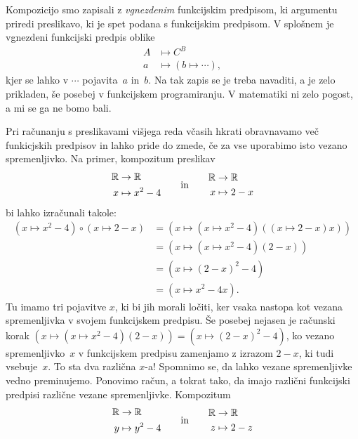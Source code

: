 Kompozicijo smo zapisali z \emph{vgnezdenim} funkcijskim predpisom, ki argumentu priredi
preslikavo, ki je spet podana s funkcijskim predpisom. V splošnem je vgnezdeni funkcijski
predpis oblike
%
\begin{align*}
  A &\mapsto C^B \\
  a &\mapsto (b \mapsto \cdots),
\end{align*}
%
kjer se lahko v $\cdots$ pojavita~$a$ in~$b$. Na tak zapis se je treba navaditi, a je zelo
prikladen, še posebej v funkcijskem programiranju. V matematiki ni zelo pogost, a mi se ga
ne bomo bali.

Pri računanju s preslikavami višjega reda včasih hkrati obravnavamo več funkicjskih
predpisov in lahko pride do zmede, če za vse uporabimo isto vezano spremenljivko. Na
primer, kompozitum preslikav
%
\begin{equation*}
  \begin{aligned}
    \mathbb{R} &\to \mathbb{R} \\
    x &\mapsto x^2 - 4
  \end{aligned}
  \qquad\text{in}\qquad
  \begin{aligned}
    \mathbb{R} &\to \mathbb{R} \\
    x &\mapsto 2 - x
  \end{aligned}
\end{equation*}
%
bi lahko izračunali takole:
%
\begin{align*}
  (x \mapsto x^2  - 4) \circ (x \mapsto 2 - x)
  &= (x \mapsto (x \mapsto x^2 - 4) ((x \mapsto 2 - x) x)) \\
  &= (x \mapsto (x \mapsto x^2 - 4) (2 - x)) \\
  &= (x \mapsto (2 - x)^2 - 4) \\
  &= (x \mapsto x^2 - 4 x).
\end{align*}
%
Tu imamo tri pojavitve $x$, ki bi jih morali ločiti, ker vsaka nastopa kot vezana
spremenljivka v svojem funkcijskem predpisu. Še posebej nejasen je računski korak
$(x \mapsto (x \mapsto x^2 - 4) (2 - x)) = (x \mapsto (2 - x)^2 - 4)$, ko vezano
spremenljivko~$x$ v funkcijskem predpisu zamenjamo z izrazom $2 - x$, ki tudi vsebuje~$x$.
To sta dva različna $x$-a! Spomnimo se, da lahko vezane spremenljivke vedno preminujemo.
Ponovimo račun, a tokrat tako, da imajo različni funkcijski predpisi različne vezane
spremenljivke. Kompozitum
%
\begin{equation*}
  \begin{aligned}
    \mathbb{R} &\to \mathbb{R} \\
    y &\mapsto y^2 - 4
  \end{aligned}
  \qquad\text{in}\qquad
  \begin{aligned}
    \mathbb{R} &\to \mathbb{R} \\
    z &\mapsto 2 - z
  \end{aligned}
\end{equation*}
